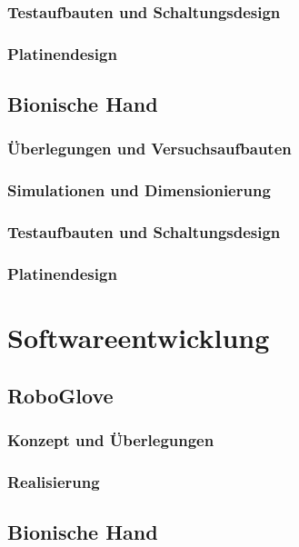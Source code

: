 \documentclass[11pt]{article}
\begin{document}
\subsubsection{Testaufbauten und Schaltungsdesign}
\subsubsection{Platinendesign}

\subsection{Bionische Hand}
\subsubsection{Überlegungen und Versuchsaufbauten}
\subsubsection{Simulationen und Dimensionierung}
\subsubsection{Testaufbauten und Schaltungsdesign}
\subsubsection{Platinendesign}


\section{Softwareentwicklung}

\subsection{RoboGlove}
\subsubsection{Konzept und Überlegungen}
\subsubsection{Realisierung}

\subsection{Bionische Hand}
\end{document}

